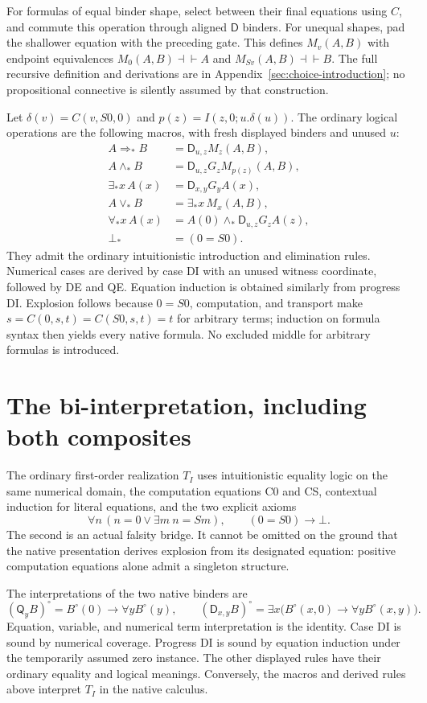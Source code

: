 \documentclass[11pt]{article}
\theoremstyle{definition}\newtheorem{definition}[theorem]{Definition}
\theoremstyle{remark}\newtheorem{remark}[theorem]{Remark}
\newcommand{\D}{\mathsf D}
\newcommand{\Q}{\mathsf Q}
\begin{document}
For formulas of equal binder shape, select between their final equations
using \(C\), and commute this operation through aligned \(\D\) binders.
For unequal shapes, pad the shallower equation with the preceding gate.
This defines \(M_v(A,B)\) with endpoint equivalences
\(M_0(A,B)\dashv\vdash A\) and \(M_{Sv}(A,B)\dashv\vdash B\).
The full recursive definition and derivations are in
Appendix~\ref{sec:choice-introduction}; no propositional connective is
silently assumed by that construction.

Let \(\delta(v)=C(v,S0,0)\) and \(p(z)=I(z,0;u.\delta(u))\).
The ordinary logical operations are the following macros, with fresh
displayed binders and unused \(u\):
\begin{align*}
 A\Rightarrow_*B&=\D_{u,z}M_z(A,B),\\
 A\wedge_*B&=\D_{u,z}G_zM_{p(z)}(A,B),\\
 \exists_*x\,A(x)&=\D_{x,y}G_yA(x),\\
 A\vee_*B&=\exists_*x\,M_x(A,B),\\
 \forall_*x\,A(x)&=A(0)\wedge_*\D_{u,z}G_zA(z),\\
 \bot_*&=(0=S0).
\end{align*}
They admit the ordinary intuitionistic introduction and elimination rules.
Numerical cases are derived by case DI with an unused witness coordinate,
followed by DE and QE. Equation induction is obtained similarly from
progress DI. Explosion follows because \(0=S0\), computation, and transport
make \(s=C(0,s,t)=C(S0,s,t)=t\) for arbitrary terms; induction on formula
syntax then yields every native formula. No excluded middle for arbitrary
formulas is introduced.

\section{The bi-interpretation, including both composites}
\label{main:bridge}

The ordinary first-order realization \(T_I\) uses intuitionistic equality
logic on the same numerical domain, the computation equations C0 and CS,
contextual induction for literal equations, and the two explicit axioms
\[
 \forall n\,(n=0\vee\exists m\ n=Sm),\qquad (0=S0)\to\bot.
\]
The second is an actual falsity bridge. It cannot be omitted on the ground
that the native presentation derives explosion from its designated equation:
positive computation equations alone admit a singleton structure.

The interpretations of the two native binders are
\[
 (\Q_yB)^\circ=B^\circ(0)\to\forall y B^\circ(y),\qquad
 (\D_{x,y}B)^\circ=\exists x\bigl(B^\circ(x,0)\to\forall yB^\circ(x,y)\bigr).
\]
Equation, variable, and numerical term interpretation is the identity.
Case DI is sound by numerical coverage. Progress DI is sound by equation
induction under the temporarily assumed zero instance. The other displayed
rules have their ordinary equality and logical meanings. Conversely, the
macros and derived rules above interpret \(T_I\) in the native calculus.
\end{document}
